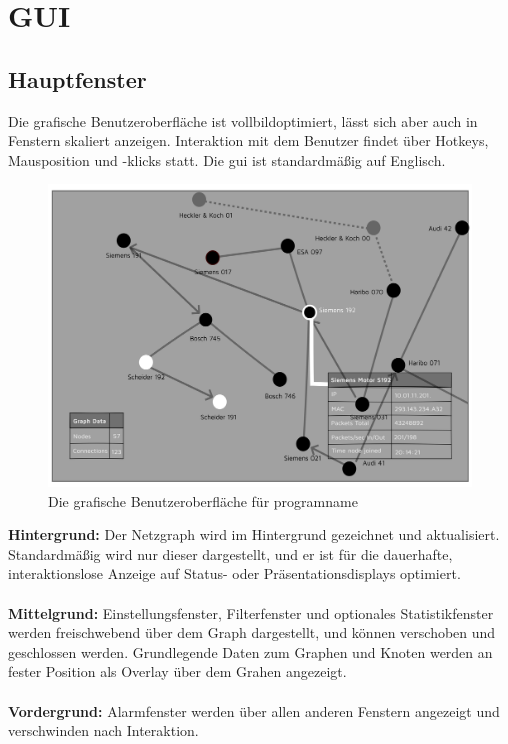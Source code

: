 \chapter{GUI}

\section{Hauptfenster}
Die grafische Benutzeroberfläche ist vollbildoptimiert, lässt sich aber auch in
Fenstern skaliert anzeigen. Interaktion mit dem Benutzer findet über Hotkeys,
Mausposition und -klicks statt.
Die \gls{gui} ist standardmäßig auf Englisch.

  \begin{figure}[h!]
    \hspace*{0.15cm}\includegraphics[scale=0.07]{./img/GUI.png}
    \caption{Die grafische Benutzeroberfläche für \gls{programname}}
  \end{figure}

\noindent \textbf{Hintergrund:} Der Netzgraph wird im Hintergrund gezeichnet und
aktualisiert. Standardmäßig wird nur dieser dargestellt, und er ist für die
dauerhafte, interaktionslose Anzeige auf Status- oder Präsentationsdisplays
optimiert.
\\ \\
\textbf{Mittelgrund:} Einstellungsfenster, Filterfenster und optionales Statistikfenster
werden freischwebend über dem Graph dargestellt, und können verschoben und
geschlossen werden. Grundlegende Daten zum Graphen und Knoten werden an fester
Position als Overlay über dem Grahen angezeigt.
\\ \\
\textbf{Vordergrund:} Alarmfenster werden über allen anderen Fenstern angezeigt und
verschwinden nach Interaktion.

